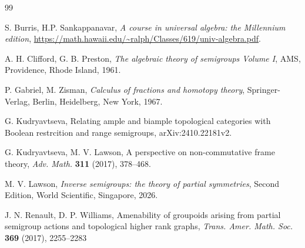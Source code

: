 \documentclass[a4paper]{amsart}
\begin{document}
\begin{thebibliography}{99}



 S. Burris, H.P. Sankappanavar, {\em A course in universal algebra: the Millennium edition},
\url{https://math.hawaii.edu/~ralph/Classes/619/univ-algebra.pdf}.

 A. H. Clifford, G. B. Preston, {\em The algebraic theory of semigroups Volume I}, AMS, Providence, Rhode Island, 1961. 

 P. Gabriel, M. Zisman, {\em Calculus of fractions and homotopy theory}, Springer-Verlag, Berlin, Heidelberg, New York, 1967.

 G. Kudryavtseva, Relating ample and biample topological categories with Boolean restrcition and range semigroups,
arXiv:2410.22181v2.

 G. Kudryavtseva, M. V. Lawson, A perspective on non-commutative frame theory, {\em Adv. Math.} {\bf 311} (2017), 378--468.

 M. V. Lawson, {\em Inverse semigroups: the theory of partial symmetries}, Second Edition, World Scientific, Singapore, 2026.


 J. N. Renault, D. P. Williams, Amenability of groupoids arising from partial semigroup actions and topological higher rank graphs,
{\em Trans. Amer. Math. Soc.} {\bf 369} (2017), 2255--2283



\end{thebibliography}
\end{document}
